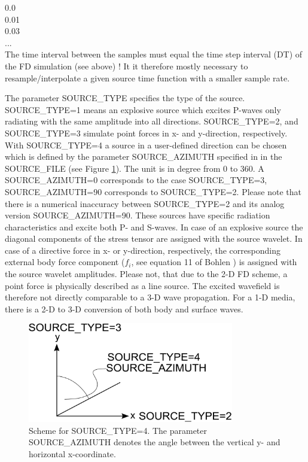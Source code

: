 \documentclass[11pt,onecolumn,oneside]{article}
\begin{document}
0.0\\
0.01\\
0.03\\
...\\

The time interval between the samples must equal the time step interval (DT) of the FD simulation (see above) ! It it therefore mostly necessary to resample/interpolate a given source time function with a smaller sample rate. 

The parameter SOURCE\_TYPE specifies the type of the source. SOURCE\_TYPE=1 means an explosive source which excites P-waves only radiating with the same amplitude into all directions. SOURCE\_TYPE=2, and SOURCE\_TYPE=3 simulate point forces in x- and y-direction, respectively. With  SOURCE\_TYPE=4 a source in a user-defined direction can be chosen which is defined by the parameter SOURCE\_AZIMUTH specified in in the SOURCE\_FILE (see Figure \ref{fig_source_azimuth}). The unit is in degree from 0 to 360. A SOURCE\_AZIMUTH=0 corresponds to the case SOURCE\_TYPE=3, SOURCE\_AZIMUTH=90  corresponds to SOURCE\_TYPE=2. Please note that there is a numerical inaccuracy between SOURCE\_TYPE=2 and its analog version SOURCE\_AZIMUTH=90. These sources have specific radiation characteristics and excite both P- and S-waves. In case of an explosive source the diagonal components of the stress tensor are assigned with the source wavelet. In case of a directive force in x- or y-direction, respectively, the corresponding external body force component ($f_i$, see equation 11 of Bohlen ) is assigned with the source wavelet amplitudes. Please not, that due to the 2-D FD scheme, a point force is physically described as a line source. The excited wavefield is therefore not directly comparable to a 3-D wave propagation. For a 1-D media, there is a 2-D to 3-D conversion of both body and surface waves.

\begin{figure}
\begin{center}
\includegraphics[width=9cm,angle=0]{eps/source_azimuth.eps}
\end{center}
\caption{Scheme for SOURCE\_TYPE=4. The parameter SOURCE\_AZIMUTH denotes the angle between the vertical y- and horizontal x-coordinate.}
\label{fig_source_azimuth}
\end{figure}
\end{document}
